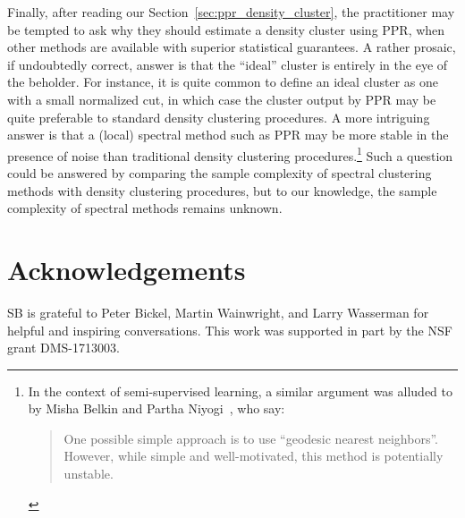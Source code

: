\documentclass[11pt,twoside]{article}
\newcommand{\1}{\mathbf{1}}
\begin{document}
Finally, after reading our Section~\ref{sec:ppr_density_cluster}, the practitioner may be tempted to ask why they should estimate a density cluster using PPR, when other methods are available with superior statistical guarantees. A rather prosaic, if undoubtedly correct, answer is that the ``ideal'' cluster is entirely in the eye of the beholder. For instance, it is quite common to define an ideal cluster as one with a small normalized cut, in which case the cluster output by PPR may be quite preferable to standard density clustering procedures. A more intriguing answer is that a (local) spectral method such as PPR may be more stable in the presence of noise than traditional density clustering procedures.\footnote{In the context of semi-supervised learning, a similar argument was alluded to by Misha Belkin and Partha Niyogi~\citep{belkin2002}, who say:
\begin{quote}
One possible simple approach is to use ``geodesic nearest neighbors''. However, while simple and well-motivated, this method is potentially unstable.	
\end{quote}
} Such a question could be answered by comparing the sample complexity of spectral clustering methods with density clustering procedures, but to our knowledge, the sample complexity of spectral methods remains unknown.

\section*{Acknowledgements}

SB is grateful to Peter Bickel, Martin Wainwright, and Larry Wasserman for
helpful and inspiring conversations. This work was supported in part by the NSF grant DMS-1713003.

\clearpage

 
\end{document}
